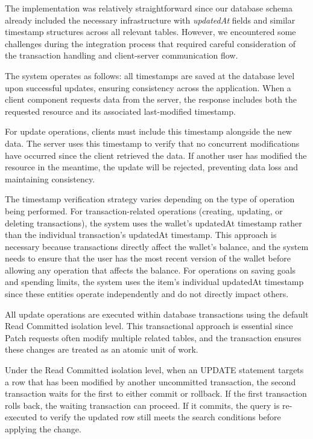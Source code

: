 The implementation was relatively straightforward since our database schema already included the necessary infrastructure with \textit{updatedAt} fields and similar timestamp structures across all relevant tables. However, we encountered some challenges during the integration process that required careful consideration of the transaction handling and client-server communication flow.

The system operates as follows: all timestamps are saved at the database level upon successful updates, ensuring consistency across the application. When a client component requests data from the server, the response includes both the requested resource and its associated last-modified timestamp.

For update operations, clients must include this timestamp alongside the new data. The server uses this timestamp to verify that no concurrent modifications have occurred since the client retrieved the data. If another user has modified the resource in the meantime, the update will be rejected, preventing data loss and maintaining consistency.

The timestamp verification strategy varies depending on the type of operation being performed. For transaction-related operations (creating, updating, or deleting transactions), the system uses the wallet's updatedAt timestamp rather than the individual transaction's updatedAt timestamp. This approach is necessary because transactions directly affect the wallet's balance, and the system needs to ensure that the user has the most recent version of the wallet before allowing any operation that affects the balance. For operations on saving goals and spending limits, the system uses the item's individual updatedAt timestamp since these entities operate independently and do not directly impact others.

All update operations are executed within database transactions using the default Read Committed isolation level. This transactional approach is essential since Patch requests often modify multiple related tables, and the transaction ensures these changes are treated as an atomic unit of work.

Under the Read Committed isolation level, when an UPDATE statement targets a row that has been modified by another uncommitted transaction, the second transaction waits for the first to either commit or rollback. If the first transaction rolls back, the waiting transaction can proceed. If it commits, the query is re-executed to verify the updated row still meets the search conditions before applying the change.

